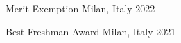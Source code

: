 



\begin{cvhonors}

  \cvhonor
  {Merit Exemption} %
  {} %
  {Milan, Italy} %
  {2022} %

  \cvhonor
  {Best Freshman Award} %
  {} %
  {Milan, Italy} %
  {2021} %

\end{cvhonors}
